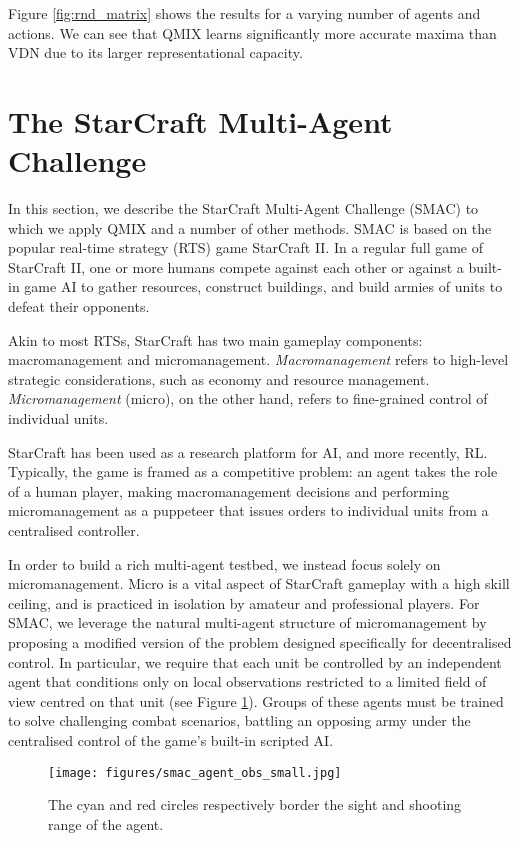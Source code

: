 \documentclass[twoside,11pt]{article}
\begin{document}
Figure \ref{fig:rnd_matrix} shows the results for a varying number of agents and actions. 
We can see that QMIX learns significantly more accurate maxima than VDN due to its larger representational capacity.  
 \section{The StarCraft Multi-Agent Challenge}
\label{sec:setting}


In this section, we describe the StarCraft Multi-Agent Challenge (SMAC) to which we apply QMIX and a number of other methods.
SMAC is based on the popular real-time strategy (RTS) game StarCraft II.
In a regular full game of StarCraft II, one or more humans compete against each other or against a built-in game AI to gather resources, construct buildings, and build armies of units to defeat their opponents.

Akin to most RTSs, StarCraft has two main gameplay components: macromanagement and micromanagement. \emph{Macromanagement} refers to high-level strategic considerations, such as economy and resource management.
\emph{Micromanagement} (micro), on the other hand, refers to fine-grained control of individual units.


StarCraft has been used as a research platform for AI, and more recently, RL. Typically, the game is framed as a competitive problem: an agent takes the role of a human player, making macromanagement decisions and performing micromanagement as a puppeteer that issues orders to individual units from a centralised controller.

In order to build a rich multi-agent testbed, we instead focus solely on micromanagement.
Micro is a vital aspect of StarCraft gameplay with a high skill ceiling, and is practiced in isolation by amateur and professional players.
For SMAC, we leverage the natural multi-agent structure of micromanagement by proposing a modified version of the problem designed specifically for decentralised control.
In particular, we require that each unit be controlled by an independent agent that conditions only on local observations restricted to a limited field of view centred on that unit (see Figure \ref{fig:obs}).
Groups of these agents must be trained to solve challenging combat scenarios, battling an opposing army under the centralised control of the game's built-in scripted AI.

\begin{figure}[t!]
	\centering
	\texttt{[image: figures/smac\_agent\_obs\_small.jpg]}
	\caption{The cyan and red circles respectively border the sight and shooting range of the agent.}
	\label{fig:obs}
\end{figure}
\end{document}
